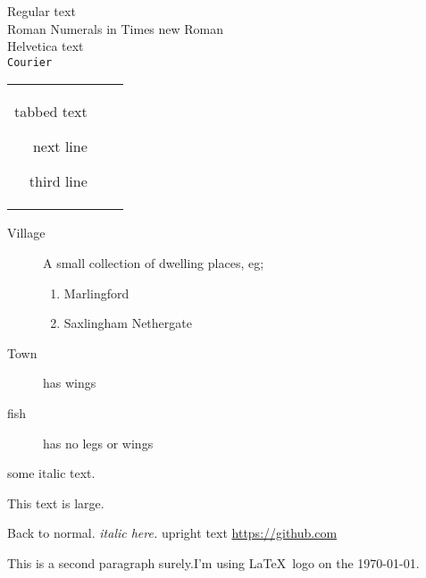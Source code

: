 \documentclass[12pt,parskip=full]{scrartcl}
\begin{document}
Regular text\\
\textrm{Roman Numerals in Times new Roman}\\
\textsf{Helvetica text}\\
\texttt{Courier}\\

\begin{tabular}{rcc}
tabbed text

next line

third line
\end{tabular}



\begin{description}
	\item[Village] {A small collection of dwelling places, eg;
		\begin{enumerate}
			\item Marlingford
			\item Saxlingham Nethergate
		\end{enumerate}
	}
	\item[Town] has wings
	\item[fish] has no legs or wings
\end{description}
\begin{itshape} some italic text. \begin{large}This text is large.\end{large} \end{itshape} Back to normal.
\mdseries
\textit{italic here.}
\textup{upright} text
\url{https://github.com}

\normalfont
This is a second paragraph surely.I'm using \LaTeX\ logo on the \today.
\end{document}

